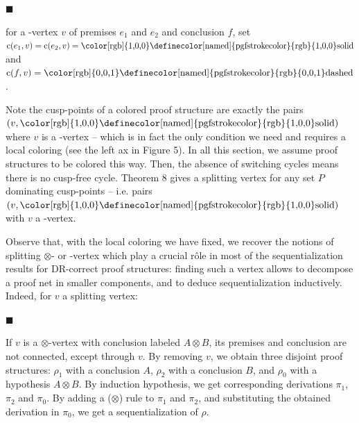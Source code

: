 \documentclass[10pt,a4paper]{amsart}
\begin{document}
 
 
\par\noindent  $\blacksquare$ 
 
for a -vertex $v$ of premises $e_{1}$ and $e_{2}$ and conclusion $f$, set $\textnormal{{c}}(e_{1},v)=\textnormal{{c}}(e_{2},v)=\text{{\color[rgb]{1,0,0}%
\definecolor[named]{pgfstrokecolor}{rgb}{1,0,0}solid}}$ and $\textnormal{{c}}(f,v)=\text{{\color[rgb]{0,0,1}\definecolor[named]{%
pgfstrokecolor}{rgb}{0,0,1}dashed}}$.\par
 
 
  
Note the cusp-points of a colored proof structure are exactly the pairs $(v,\text{{\color[rgb]{1,0,0}\definecolor[named]{pgfstrokecolor}{rgb}{1,0,0}%
solid}})$ where $v$ is a -vertex – which is in fact the only condition we need and requires a local coloring (see the left ax in Figure 5). In all this section, we assume proof structures to be colored this way. Then, the absence of switching cycles means there is no cusp-free cycle. Theorem 8 gives a splitting vertex for any set $P$ dominating cusp-points – i.e. pairs $(v,\text{{\color[rgb]{1,0,0}\definecolor[named]{pgfstrokecolor}{rgb}{1,0,0}%
solid}})$ with $v$ a -vertex.\par
 
 
 
Observe that, with the local coloring we have fixed, we recover the notions of splitting $\otimes$- or -vertex which play a crucial rôle in most of the sequentialization results for DR-correct proof structures: finding such a vertex allows to decompose a proof net in smaller components, and to deduce sequentialization inductively. Indeed, for $v$ a splitting vertex:\par
  
\par\noindent  $\blacksquare$ 
 
If $v$ is a $\otimes$-vertex with conclusion labeled $A\otimes B$, its premises and conclusion are not connected, except through $v$. By removing $v$, we obtain three disjoint proof structures: $\rho_{1}$ with a conclusion $A$, $\rho_{2}$ with a conclusion $B$, and $\rho_{0}$ with a hypothesis $A\otimes B$. By induction hypothesis, we get corresponding derivations $\pi_{1}$, $\pi_{2}$ and $\pi_{0}$. By adding a ($\otimes$) rule to $\pi_{1}$ and $\pi_{2}$, and substituting the obtained derivation in $\pi_{0}$, we get a sequentialization of $\rho$.\par
 
\end{document}
